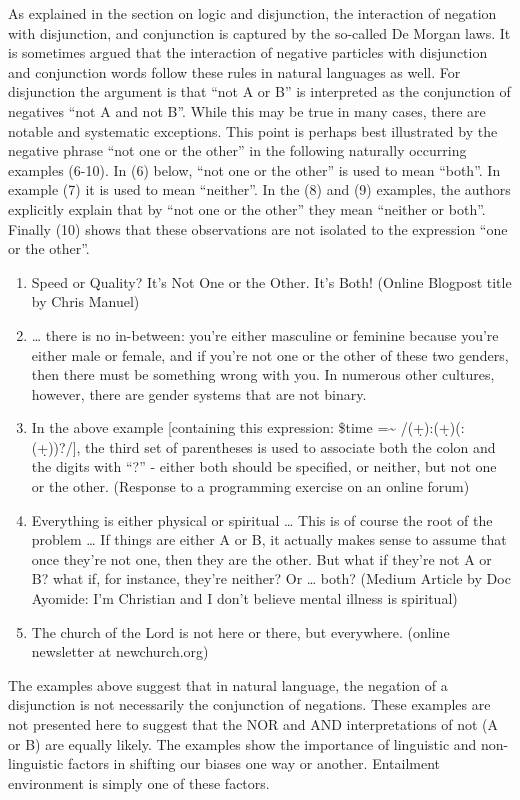 \documentclass[oneside]{report}
\theoremstyle{definition}
\theoremstyle{definition}
\theoremstyle{definition}
\theoremstyle{remark}
\begin{document}
As explained in the section on logic and disjunction, the interaction of
negation with disjunction, and conjunction is captured by the so-called
De Morgan laws. It is sometimes argued that the interaction of negative
particles with disjunction and conjunction words follow these rules in
natural languages as well. For disjunction the argument is that ``not A
or B'' is interpreted as the conjunction of negatives ``not A and not
B''. While this may be true in many cases, there are notable and
systematic exceptions. This point is perhaps best illustrated by the
negative phrase ``not one or the other'' in the following naturally
occurring examples (6-10). In (6) below, ``not one or the other'' is
used to mean ``both''. In example (7) it is used to mean ``neither''. In
the (8) and (9) examples, the authors explicitly explain that by ``not
one or the other'' they mean ``neither or both''. Finally (10) shows
that these observations are not isolated to the expression ``one or the
other''.
\begin{enumerate}
\def\labelenumi{(\arabic{enumi})}
\setcounter{enumi}{5}
\item
  Speed or Quality? It's Not One or the Other. It's Both! (Online
  Blogpost title by Chris Manuel)
\item
  \ldots{} there is no in-between: you're either masculine or feminine
  because you're either male or female, and if you're not one or the
  other of these two genders, then there must be something wrong with
  you. In numerous other cultures, however, there are gender systems
  that are not binary.
\item
  In the above example {[}containing this expression: \$time
  =\textasciitilde{} /(\d+):(\d+)(:(\d+))?/{]}, the third set of
  parentheses is used to associate both the colon and the digits with
  ``?'' - either both should be specified, or neither, but not one or
  the other. (Response to a programming exercise on an online forum)
\item
  Everything is either physical or spiritual \ldots{} This is of course
  the root of the problem \ldots{} If things are either A or B, it
  actually makes sense to assume that once they're not one, then they
  are the other. But what if they're not A or B? what if, for instance,
  they're neither? Or \ldots{} both? (Medium Article by Doc Ayomide: I'm
  Christian and I don't believe mental illness is spiritual)
\item
  The church of the Lord is not here or there, but everywhere. (online
  newsletter at newchurch.org)
\end{enumerate}
The examples above suggest that in natural language, the negation of a
disjunction is not necessarily the conjunction of negations. These
examples are not presented here to suggest that the NOR and AND
interpretations of not (A or B) are equally likely. The examples show
the importance of linguistic and non-linguistic factors in shifting our
biases one way or another. Entailment environment is simply one of these
factors.
\end{document}

